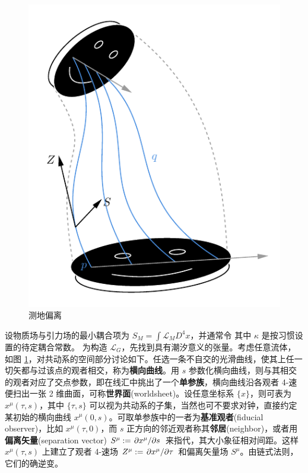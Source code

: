 \begin{figure}[ht]\centering
    \includegraphics[width=.5\textwidth]{fig/chpt01/geo-devi.pdf}
            \caption{测地偏离}
            \label{fig:geo-devi}
\end{figure}
设物质场与引力场的最小耦合项为 $S_M=\int\mathcal L_M D^4{x}$，并通常令
其中 $\kappa$ 是按习惯设置的待定耦合常数。
为构造 $\mathcal L_G$，先找到具有潮汐意义的张量。考虑任意流体，如图 \ref{fig:geo-devi}，对共动系的空间部分讨论如下。任选一条不自交的光滑曲线，使其上任一切矢都与过该点的观者相交，称为\textbf{横向曲线}。用 $s$ 参数化横向曲线，则与其相交的观者对应了交点参数，即在线汇中挑出了一个\textbf{单参族}，横向曲线沿各观者 4-速便扫出一张 2 维曲面，可称\textbf{世界面}(worldsheet)。设任意坐标系 $\{x\}$，则可表为 $x^\mu(\tau,s)$，其中 $\{\tau,s\}$ 可以视为共动系的子集，当然也可不要求对钟，直接约定某初始的横向曲线 $x^\mu(0,s)$。可取单参族中的一者为\textbf{基准观者}(fiducial observer)，比如 $x^\mu(\tau,0)$，而 $s$ 正方向的邻近观者称其\textbf{邻居}(neighbor)，或者用\textbf{偏离矢量}(separation vector) $S^\mu:=\pdv*{x^\mu}{s}$ 来指代，其大小象征相对间距。这样 $x^\mu(\tau,s)$ 上建立了观者 4-速场 $Z^\mu:=\pdv*{x^\mu}{\tau}$ 和偏离矢量场 $S^\mu$。由链式法则，它们的确逆变。

